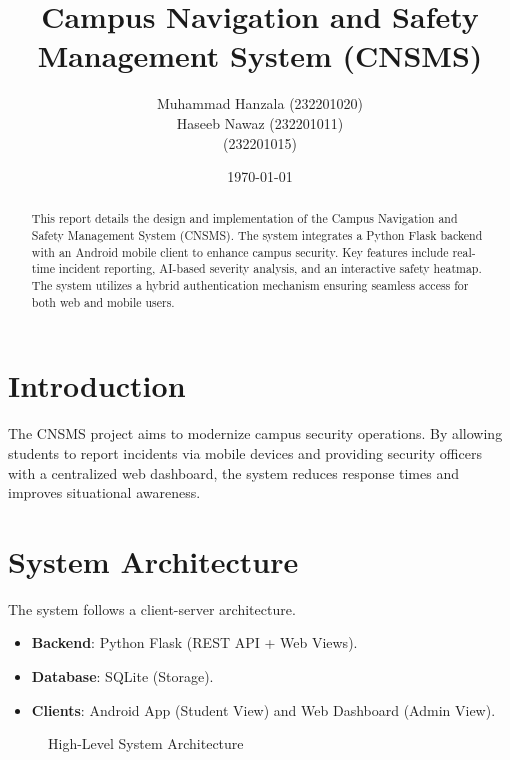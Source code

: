 \documentclass[a4paper,12pt]{article}
\title{\textbf{Campus Navigation and Safety Management System (CNSMS)}}
\author{Muhammad Hanzala (232201020) \\ Haseeb Nawaz (232201011) \\ [Third Member] (232201015)}
\date{\today}
\begin{document}
\maketitle
\begin{abstract}
This report details the design and implementation of the Campus Navigation and Safety Management System (CNSMS). The system integrates a Python Flask backend with an Android mobile client to enhance campus security. Key features include real-time incident reporting, AI-based severity analysis, and an interactive safety heatmap. The system utilizes a hybrid authentication mechanism ensuring seamless access for both web and mobile users.
\end{abstract}

\tableofcontents
\newpage

\section{Introduction}
The CNSMS project aims to modernize campus security operations. By allowing students to report incidents via mobile devices and providing security officers with a centralized web dashboard, the system reduces response times and improves situational awareness.

\section{System Architecture}
The system follows a client-server architecture.
\begin{itemize}
    \item \textbf{Backend}: Python Flask (REST API + Web Views).
    \item \textbf{Database}: SQLite (Storage).
    \item \textbf{Clients}: Android App (Student View) and Web Dashboard (Admin View).
\end{itemize}

\begin{figure}[h]
    \centering
    \caption{High-Level System Architecture}
\end{figure}
\end{document}

